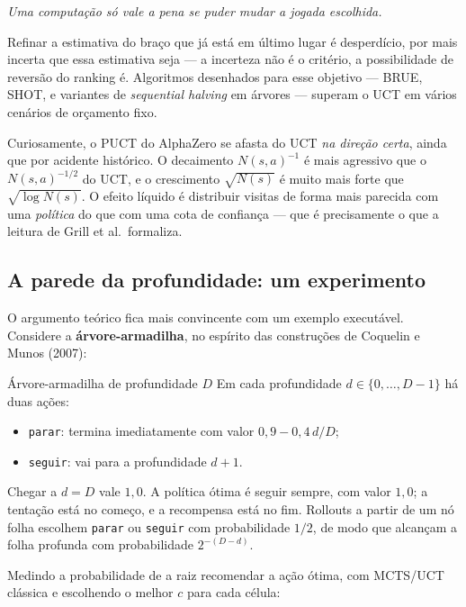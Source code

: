 \documentclass[11pt]{article}
\newcommand{\Nvis}{N}
\begin{document}
\begin{center}
\emph{Uma computação só vale a pena se puder mudar a jogada escolhida.}
\end{center}

Refinar a estimativa do braço que já está em último lugar é desperdício, por mais
incerta que essa estimativa seja — a incerteza não é o critério, a possibilidade
de reversão do ranking é. Algoritmos desenhados para esse objetivo — BRUE, SHOT, e
variantes de \emph{sequential halving} em árvores — superam o UCT em vários
cenários de orçamento fixo.

\begin{ideiabox}
Curiosamente, o PUCT do AlphaZero se afasta do UCT \emph{na direção certa}, ainda
que por acidente histórico. O decaimento $\Nvis(s,a)^{-1}$ é mais agressivo que o
$\Nvis(s,a)^{-1/2}$ do UCT, e o crescimento $\sqrt{\Nvis(s)}$ é muito mais forte
que $\sqrt{\log \Nvis(s)}$. O efeito líquido é distribuir visitas de forma mais
parecida com uma \emph{política} do que com uma cota de confiança — que é
precisamente o que a leitura de Grill et al.\ formaliza.
\end{ideiabox}

\subsection{A parede da profundidade: um experimento}

O argumento teórico fica mais convincente com um exemplo executável. Considere a
\textbf{árvore-armadilha}, no espírito das construções de Coquelin e Munos (2007):

\begin{algbox}{Árvore-armadilha de profundidade $D$}
Em cada profundidade $d \in \{0,\dots,D-1\}$ há duas ações:
\begin{itemize}
  \item \texttt{parar}: termina imediatamente com valor $0{,}9 - 0{,}4\,d/D$;
  \item \texttt{seguir}: vai para a profundidade $d+1$.
\end{itemize}
Chegar a $d = D$ vale $1{,}0$. A política ótima é seguir sempre, com valor
$1{,}0$; a tentação está no começo, e a recompensa está no fim. Rollouts a partir
de um nó folha escolhem \texttt{parar} ou \texttt{seguir} com probabilidade
$1/2$, de modo que alcançam a folha profunda com probabilidade $2^{-(D-d)}$.
\end{algbox}

Medindo a probabilidade de a raiz recomendar a ação ótima, com MCTS/UCT clássica e
escolhendo o melhor $c$ para cada célula:
\end{document}
